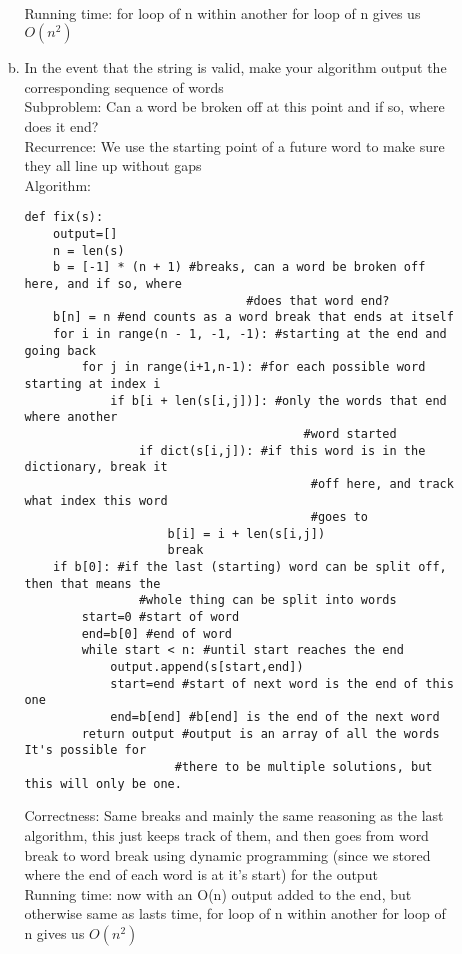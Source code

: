 \documentclass[11pt]{article}
\begin{document}
\begin{itemize}
\begin{itemize}
\begin{enumerate}[(a)]
\\Running time: for loop of n within another for loop of n gives us $O(n^2)$
\item In the event that the string is valid, make your algorithm output the corresponding sequence of words
\\Subproblem: Can a word be broken off at this point and if so, where does it end?
\\Recurrence: We use the starting point of a future word to make sure they all line up without gaps
\\Algorithm:
\begin{verbatim}
def fix(s):
    output=[]
    n = len(s)
    b = [-1] * (n + 1) #breaks, can a word be broken off here, and if so, where 
                               #does that word end?
    b[n] = n #end counts as a word break that ends at itself
    for i in range(n - 1, -1, -1): #starting at the end and going back
        for j in range(i+1,n-1): #for each possible word starting at index i
            if b[i + len(s[i,j])]: #only the words that end where another
                                       #word started
                if dict(s[i,j]): #if this word is in the dictionary, break it 
                                        #off here, and track what index this word 
                                        #goes to
                    b[i] = i + len(s[i,j])
                    break
    if b[0]: #if the last (starting) word can be split off, then that means the 
                #whole thing can be split into words
        start=0 #start of word
        end=b[0] #end of word
        while start < n: #until start reaches the end
            output.append(s[start,end])
            start=end #start of next word is the end of this one
            end=b[end] #b[end] is the end of the next word
        return output #output is an array of all the words It's possible for 
                     #there to be multiple solutions, but this will only be one.
\end{verbatim}
Correctness: Same breaks and mainly the same reasoning as the last algorithm, this just keeps track of them, and then goes from word break to word break using dynamic programming (since we stored where the end of each word is at it's start) for the output
\\Running time: now with an O(n) output added to the end, but otherwise same as lasts time, for loop of n within another for loop of n gives us $O(n^2)$
\end{enumerate}


\end{itemize}
\end{itemize}
\end{document}
